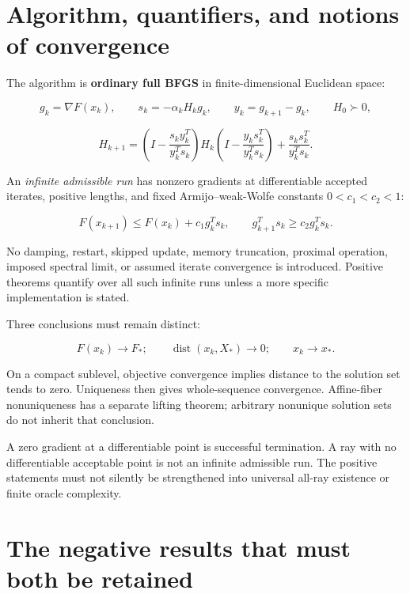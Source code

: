 \section{Algorithm, quantifiers, and notions of convergence}\label{algorithm-quantifiers-and-notions-of-convergence}

The algorithm is \textbf{ordinary full BFGS} in finite-dimensional Euclidean space:

\[
 g_k=\nabla F(x_k),\qquad s_k=-\alpha_kH_kg_k,\qquad
 y_k=g_{k+1}-g_k,\qquad H_0\succ0,
\]

\[
 H_{k+1}=\left(I-\frac{s_ky_k^T}{y_k^Ts_k}\right)H_k
 \left(I-\frac{y_ks_k^T}{y_k^Ts_k}\right)
 +\frac{s_ks_k^T}{y_k^Ts_k}.
\]

An \emph{infinite admissible run} has nonzero gradients at differentiable accepted iterates, positive lengths, and fixed Armijo--weak-Wolfe constants \(0<c_1<c_2<1\):

\[
 F(x_{k+1})\le F(x_k)+c_1g_k^Ts_k,\qquad
 g_{k+1}^Ts_k\ge c_2g_k^Ts_k.
\]

No damping, restart, skipped update, memory truncation, proximal operation, imposed spectral limit, or assumed iterate convergence is introduced. Positive theorems quantify over all such infinite runs unless a more specific implementation is stated.

Three conclusions must remain distinct:

\[
 F(x_k)\to F_*;\qquad \operatorname{dist}(x_k,X_*)\to0;\qquad x_k\to x_*.
\]

On a compact sublevel, objective convergence implies distance to the solution set tends to zero. Uniqueness then gives whole-sequence convergence. Affine-fiber nonuniqueness has a separate lifting theorem; arbitrary nonunique solution sets do not inherit that conclusion.

A zero gradient at a differentiable point is successful termination. A ray with no differentiable acceptable point is not an infinite admissible run. The positive statements must not silently be strengthened into universal all-ray existence or finite oracle complexity.



\section{The negative results that must both be retained}\label{the-negative-results-that-must-both-be-retained}

